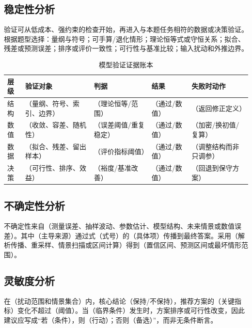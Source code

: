 \documentclass[UTF8,zihao=-4]{ctexart}
\newcommand{\fillin}[1]{（#1）}
\begin{document}
\subsection{稳定性分析}

验证可从低成本、强约束的检查开始，再进入与本题任务相符的数据或决策验证。根据题型选择：量纲与符号；可手算/退化情形；理论恒等式或守恒关系；拟合、残差或预测误差；排序或评价一致性；可行性与基准比较；输入扰动和外推边界。

\begin{table}[htbp]
  \centering
  \caption{模型验证证据账本}
  \small
  \begin{tabularx}{0.94\textwidth}{C{1.4cm}LLYL}
    \toprule
    层级 & 验证对象 & 判据 & 结果 & 失败时动作 \\
    \midrule
    结构 & \fillin{量纲、符号、索引、边界} & \fillin{理论恒等/范围} & \fillin{通过/数值} & \fillin{返回修正定义} \\
    数值 & \fillin{收敛、容差、随机性} & \fillin{误差阈值/重复稳定} & \fillin{通过/数值} & \fillin{加密/换初值/复算} \\
    数据 & \fillin{拟合、残差、留出样本} & \fillin{评价指标阈值} & \fillin{通过/数值} & \fillin{调整结构而非只调参} \\
    决策 & \fillin{可行性、排序、效益} & \fillin{裕度/基准改善} & \fillin{通过/数值} & \fillin{回退到保守方案} \\
    \bottomrule
  \end{tabularx}
\end{table}

\subsection{不确定性分析}

不确定性来自\fillin{测量误差、抽样波动、参数估计、模型结构、未来情景或数值误差}。其中\fillin{主导来源}通过式\fillin{式号}的\fillin{具体项}传播到最终答案。采用\fillin{解析传播、重采样、情景扫描或区间计算}得到\fillin{置信区间、预测区间或最坏情形范围}。

\subsection{灵敏度分析}

在\fillin{扰动范围和情景集合}内，核心结论\fillin{保持/不保持}，推荐方案的\fillin{关键指标}变化不超过\fillin{阈值}。当\fillin{临界条件}发生时，方案排序或可行性改变，因此建议应写成“若\fillin{条件}，则\fillin{行动}；否则\fillin{备选}”，而非无条件断言。
\end{document}
